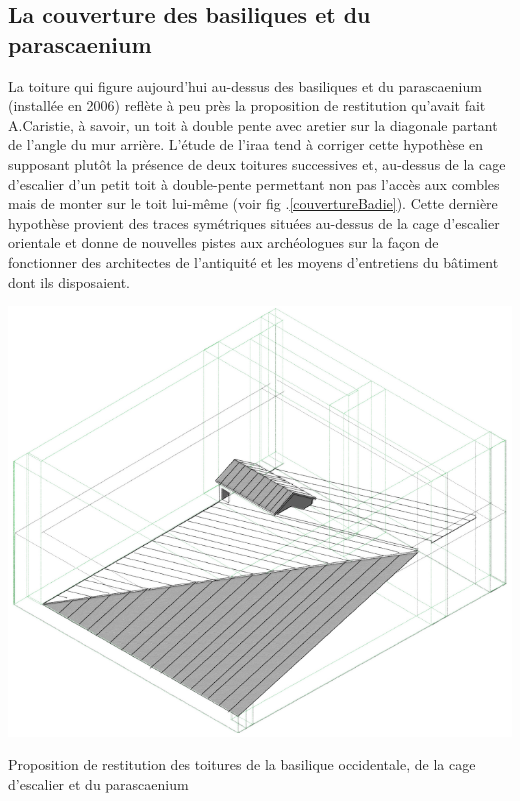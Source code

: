 	\subsection{La couverture des \glspl{basilique} et du \gls{parascaenium}}
	\label{couverture-basi}
		
		La toiture qui figure aujourd'hui au-dessus des \glspl{basilique} et du \gls{parascaenium} (installée en 2006) reflète à peu près la proposition de restitution qu'avait fait A.Caristie, à savoir, un toit à double pente avec \gls{aretier} sur la diagonale partant de l'angle du mur arrière. L'étude de l'\gls{iraa} tend à corriger cette hypothèse en supposant plutôt la présence de deux toitures successives et, au-dessus de la cage d’escalier d’un petit toit à double-pente permettant non pas l’accès aux combles mais de monter sur le toit lui-même (voir fig .\ref{couvertureBadie}). Cette dernière hypothèse provient des traces symétriques situées au-dessus de la cage d’escalier orientale et donne de nouvelles pistes aux archéologues sur la façon de fonctionner des architectes de l'antiquité et les moyens d'entretiens du bâtiment dont ils disposaient. 
		
		\begin{figureth}
			\includegraphics[width=\linewidth]{images/couvertureBadie}
			\caption[Toitures de basiliques par A.Badie]{Proposition de restitution des toitures de la \gls{basilique} occidentale, de la cage d'escalier et du \gls{parascaenium} \cite[Pl. XLVII]{orangePl}}
			\label{couvertureBadie}
		\end{figureth}	

